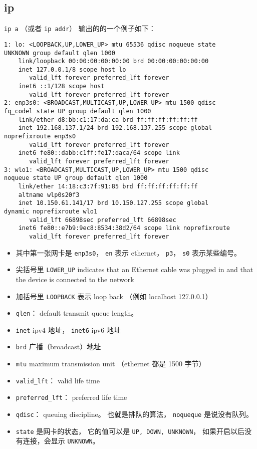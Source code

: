 \subsection{ip}
\verb|ip a| （或者 \verb|ip addr|） 输出的的一个例子如下：
\begin{lstlisting}[language=none]
1: lo: <LOOPBACK,UP,LOWER_UP> mtu 65536 qdisc noqueue state 
UNKNOWN group default qlen 1000
    link/loopback 00:00:00:00:00:00 brd 00:00:00:00:00:00
    inet 127.0.0.1/8 scope host lo
       valid_lft forever preferred_lft forever
    inet6 ::1/128 scope host 
       valid_lft forever preferred_lft forever
2: enp3s0: <BROADCAST,MULTICAST,UP,LOWER_UP> mtu 1500 qdisc
fq_codel state UP group default qlen 1000
    link/ether d8:bb:c1:17:da:ca brd ff:ff:ff:ff:ff:ff
    inet 192.168.137.1/24 brd 192.168.137.255 scope global 
noprefixroute enp3s0
       valid_lft forever preferred_lft forever
    inet6 fe80::dabb:c1ff:fe17:daca/64 scope link 
       valid_lft forever preferred_lft forever
3: wlo1: <BROADCAST,MULTICAST,UP,LOWER_UP> mtu 1500 qdisc
noqueue state UP group default qlen 1000
    link/ether 14:18:c3:7f:91:85 brd ff:ff:ff:ff:ff:ff
    altname wlp0s20f3
    inet 10.150.61.141/17 brd 10.150.127.255 scope global 
dynamic noprefixroute wlo1
       valid_lft 66898sec preferred_lft 66898sec
    inet6 fe80::e7b9:9ec8:8534:38d2/64 scope link noprefixroute 
       valid_lft forever preferred_lft forever
\end{lstlisting}
\begin{itemize}
\item 其中第一张网卡是 \verb|enp3s0|， \verb|en| 表示 ethernet， \verb|p3|， \verb|s0| 表示某些编号。
\item 尖括号里 \verb|LOWER_UP| indicates that an Ethernet cable was plugged in and that the device is connected to the network
\item 加括号里 \verb|LOOPBACK| 表示 loop back （例如 localhost 127.0.0.1）
\item \verb|qlen|： default transmit queue length。
\item \verb|inet| ipv4 地址， \verb|inet6| ipv6 地址
\item \verb|brd| 广播（broadcast）地址
\item \verb|mtu| maximum transmission unit （ethernet 都是 1500 字节）
\item \verb|valid_lft|： valid life time
\item \verb|preferred_lft|： preferred life time
\item \verb|qdisc|： queuing discipline。 也就是排队的算法， \verb|noqueque| 是说没有队列。
\item \verb|state| 是网卡的状态， 它的值可以是 \verb|UP, DOWN, UNKNOWN|， 如果开启以后没有连接，会显示 \verb|UNKNOWN|。
\end{itemize}


